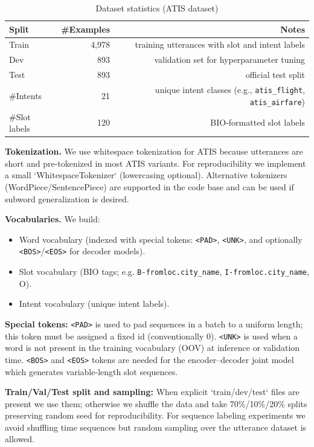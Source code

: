 \documentclass[conference]{IEEEtran}
\begin{document}

\begin{table}[!t]
  \centering
  \caption{Dataset statistics (ATIS dataset)}
  \begin{tabular}{lrr}
  \toprule
  Split & \#Examples & Notes \\
  \midrule
  Train & 4,978 & training utterances with slot and intent labels \\
  Dev & 893 & validation set for hyperparameter tuning \\
  Test & 893 & official test split \\
  \midrule
  \#Intents & 21 & unique intent classes (e.g., \texttt{atis\_flight}, \texttt{atis\_airfare}) \\
  \#Slot labels & 120 & BIO-formatted slot labels \\
  \bottomrule
  \end{tabular}
  \label{tab:dataset-stats}
\end{table}

\textbf{Tokenization.} We use whitespace tokenization for ATIS because utterances are short and pre-tokenized in most ATIS variants. For reproducibility we implement a small `WhitespaceTokenizer` (lowercasing optional). Alternative tokenizers (WordPiece/SentencePiece) are supported in the code base and can be used if subword generalization is desired.

\textbf{Vocabularies.} We build:
\begin{itemize}
  \item Word vocabulary (indexed with special tokens: \texttt{<PAD>}, \texttt{<UNK>}, and optionally \texttt{<BOS>}/\texttt{<EOS>} for decoder models).
  \item Slot vocabulary (BIO tags; e.g. \texttt{B-fromloc.city\_name}, \texttt{I-fromloc.city\_name}, O).
  \item Intent vocabulary (unique intent labels).
\end{itemize}

\textbf{Special tokens:} \texttt{<PAD>} is used to pad sequences in a batch to a uniform length; this token must be assigned a fixed id (conventionally 0). \texttt{<UNK>} is used when a word is not present in the training vocabulary (OOV) at inference or validation time. \texttt{<BOS>} and \texttt{<EOS>} tokens are needed for the encoder--decoder joint model which generates variable-length slot sequences.

\textbf{Train/Val/Test split and sampling:} When explicit `train/dev/test` files are present we use them; otherwise we shuffle the data and take 70\%/10\%/20\% splits preserving random seed for reproducibility. For sequence labeling experiments we avoid shuffling time sequences but random sampling over the utterance dataset is allowed.
\end{document}
